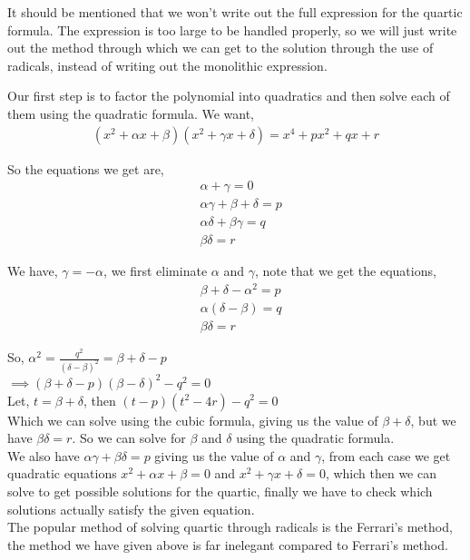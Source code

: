 It should be mentioned that we won't write out the full expression for the quartic formula. The expression is too large to be handled properly, so we will just write out the method through which we can get to the solution through the use of radicals, instead of writing out the monolithic expression.

Our first step is to factor the polynomial into quadratics and then solve each of them using the quadratic formula. We want,
\begin{align*}
(x^2+\alpha x+\beta)(x^2+\gamma x+\delta)=x^4+px^2+qx+r
\end{align*}

So the equations we get are,
\begin{align*}
&\alpha+\gamma=0\\
&\alpha\gamma+\beta+\delta=p\\
&\alpha\delta+\beta\gamma=q\\
&\beta\delta=r
\end{align*}

We have, $\gamma=-\alpha$, we first eliminate $\alpha$ and $\gamma$, note that we get the equations,
\begin{align*}
&\beta+\delta-\alpha^2=p\\
&\alpha(\delta-\beta)=q\\
&\beta\delta=r
\end{align*}

So, $\alpha^2=\frac{q^2}{(\delta-\beta)^2}=\beta+\delta-p$\\

$\implies(\beta+\delta-p)(\beta-\delta)^2-q^2=0$\\

Let, $t=\beta+\delta$, then
$(t-p)(t^2-4r)-q^2=0$\\
Which we can solve using the cubic formula, giving us the value of $\beta+\delta$, but we have $\beta\delta=r$. So we can solve for $\beta$ and $\delta$ using the quadratic formula.\\
We also have $\alpha\gamma+\beta\delta=p$ giving us the value of $\alpha$ and $\gamma$, from each case we get quadratic equations $x^2+\alpha x+\beta=0$ and $x^2+\gamma x+\delta=0$, which then we can solve to get possible solutions for the quartic, finally we have to check which solutions actually satisfy the given equation.\\

The popular method of solving quartic through radicals is the Ferrari's method, the method we have given above is far inelegant compared to Ferrari's method.

